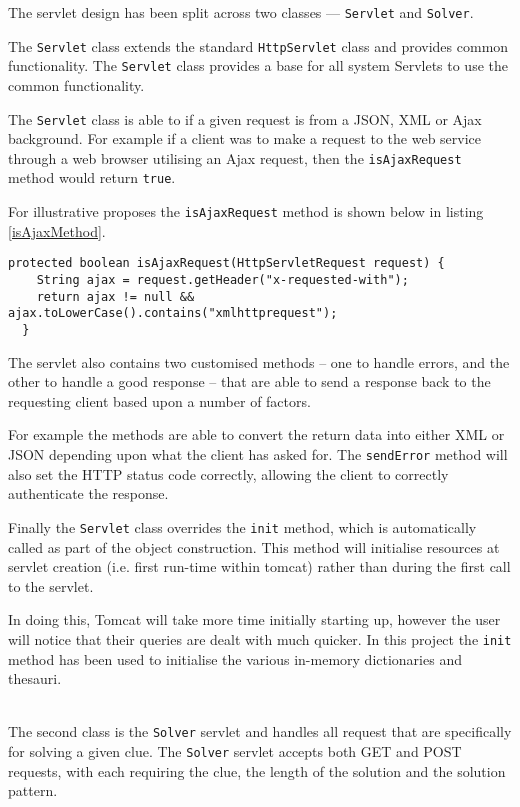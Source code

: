 The servlet design has been split across two classes --- \texttt{Servlet} and 
\texttt{Solver}.

The \texttt{Servlet} class extends the standard \texttt{HttpServlet} class and
provides common functionality. The \texttt{Servlet} class provides a base for 
all system Servlets to use the common functionality.

The \texttt{Servlet} class is able to if a given request is from a JSON, XML or 
Ajax background. For example if a client was to make a request to the web 
service through a web browser utilising an Ajax request, then the 
\texttt{isAjaxRequest}  method would return \texttt{true}.

For illustrative proposes the \texttt{isAjaxRequest} method is shown below in 
listing \ref{isAjaxMethod}.

\begin{lstlisting}[caption={isAjaxMethod deduces if a request was made by AJAX},
                   label=isAjaxMethod]  
  protected boolean isAjaxRequest(HttpServletRequest request) {
    String ajax = request.getHeader("x-requested-with");
    return ajax != null && ajax.toLowerCase().contains("xmlhttprequest");
  }
\end{lstlisting}

The servlet also contains two customised methods -- one to handle errors, and 
the other to handle a good response -- that are able to send a response back to 
the requesting client based upon a number of factors.

For example the methods are able to convert the return data into either XML or 
JSON depending upon what the client has asked for. The \texttt{sendError} method
will also set the HTTP status code correctly, allowing the client to correctly 
authenticate the response.

Finally the \texttt{Servlet} class overrides the \texttt{init} method, which 
is automatically called as part of the object construction. This method will 
initialise resources at servlet creation (i.e. first run-time within tomcat) 
rather than during the first call to the servlet. 

In doing this, Tomcat will take more time initially starting up, however the 
user will notice that their queries are dealt with much quicker. In this project
the \texttt{init} method has been used to initialise the various in-memory 
dictionaries and thesauri.

~\\

The second class is the \texttt{Solver} servlet and handles all request that are
specifically for solving a given clue. The \texttt{Solver} servlet accepts both
GET and POST requests, with each requiring the clue, the length of the solution
and the solution pattern.

